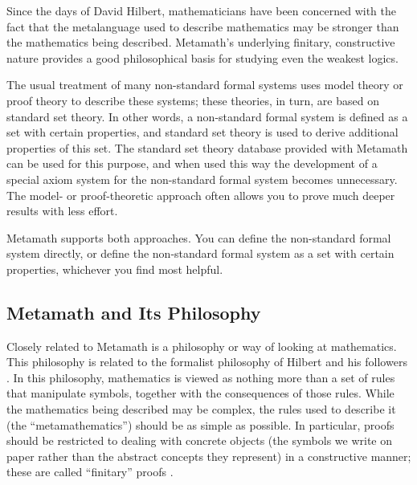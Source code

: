 Since the days of David Hilbert, mathematicians have
been concerned with the fact that the metalanguage used to
describe mathematics may be stronger than the mathematics being described.
Metamath's underlying finitary,
constructive nature provides a good philosophical basis for studying even the
weakest logics.

The usual treatment of many non-standard formal systems uses model theory or proof theory to describe these systems; these theories, in turn, are based on
standard set theory.  In other words, a non-standard formal system is defined
as a set with certain properties, and standard set theory is used to derive
additional properties of this set.  The standard set theory database provided
with Metamath can be used for this purpose, and when used this way
the development of a special
axiom system for the non-standard formal system becomes unnecessary.  The
model- or proof-theoretic approach often allows you to prove much deeper
results with less effort.

Metamath supports both approaches.  You can define the non-standard
formal system directly, or define the non-standard formal system as
a set with certain properties, whichever you find most helpful.


\subsection{Metamath and Its Philosophy}

Closely related to Metamath is a philosophy or way of looking
at mathematics. This philosophy is related to the formalist
philosophy of Hilbert and his followers
\cite[pp.~1203--1208]{Kline}
\cite[p.~6]{Behnke}. In this philosophy, mathematics is
viewed as nothing more than a set of rules that manipulate symbols, together
with the consequences of those rules.  While the mathematics being described
may be complex, the rules used to describe it (the
``metamathematics'') should be as simple as possible.
In particular, proofs should be restricted to dealing with concrete objects
(the symbols we write on paper rather than the abstract concepts they
represent) in a constructive manner; these are called ``finitary''
proofs \cite[pp.~2--3]{Shoenfield}.


